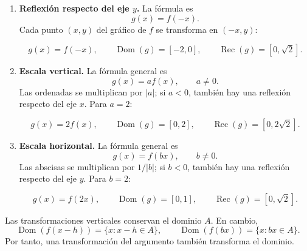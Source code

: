 \begin{proposicion}[de transformación]
\begin{enumerate}
\item \textbf{Reflexión respecto del eje $y$.} La fórmula es
\[
g(x)=f(-x).
\]
Cada punto $(x,y)$ del gráfico de $f$ se transforma en $(-x,y)$:
\begin{center}
\[
g(x)=f(-x),\qquad
\operatorname{Dom}(g)=[-2,0],\qquad
\operatorname{Rec}(g)=[0,\sqrt2].
\]
\end{center}

\item \textbf{Escala vertical.} La fórmula general es
\[
g(x)=a f(x),\qquad a\neq0.
\]
Las ordenadas se multiplican por $|a|$; si $a<0$, también hay una reflexión respecto del eje $x$. Para $a=2$:
\begin{center}
\[
g(x)=2f(x),\qquad
\operatorname{Dom}(g)=[0,2],\qquad
\operatorname{Rec}(g)=[0,2\sqrt2].
\]
\end{center}

\item \textbf{Escala horizontal.} La fórmula general es
\[
g(x)=f(bx),\qquad b\neq0.
\]
Las abscisas se multiplican por $1/|b|$; si $b<0$, también hay una reflexión respecto del eje $y$. Para $b=2$:
\begin{center}
\[
g(x)=f(2x),\qquad
\operatorname{Dom}(g)=[0,1],\qquad
\operatorname{Rec}(g)=[0,\sqrt2].
\]
\end{center}
\end{enumerate}

Las transformaciones verticales conservan el dominio $A$. En cambio,
\[
\operatorname{Dom}(f(x-h))=\{x:x-h\in A\},\qquad
\operatorname{Dom}(f(bx))=\{x:bx\in A\}.
\]
Por tanto, una transformación del argumento también transforma el dominio.
\end{proposicion}

